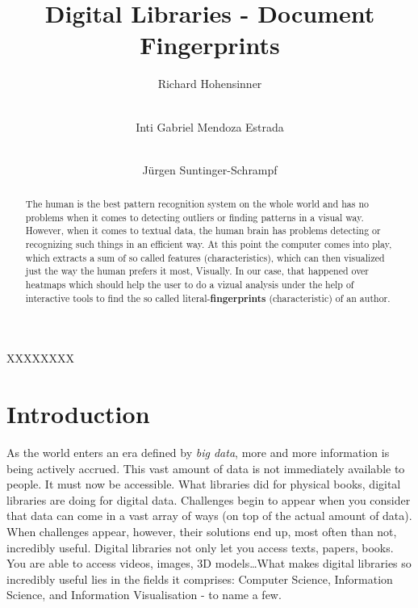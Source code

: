 \documentclass[runningheads]{llncs}
\begin{document}
\title{Digital Libraries - Document Fingerprints}

\author{Richard Hohensinner \and \\
Inti Gabriel Mendoza Estrada \and     \\
Jürgen Suntinger-Schrampf}

\maketitle              %

\begin{abstract}
The human is the best pattern recognition system on the whole world and has no problems when it comes to detecting outliers or finding patterns in a visual way. However, when it comes to textual data, the human brain has problems detecting or recognizing such things in an efficient way. At this point the computer comes into play, which extracts a sum of so called features (characteristics), which can then visualized just the way the human prefers it most, Visually. In our case, that happened over heatmaps which should help the user to do a vizual analysis under the help of interactive tools to find the so called literal-\textbf{fingerprints} (characteristic) of an author.

\end{abstract}


XXXXXXXX
\section{Introduction}
As the world enters an era defined by \textit{big data}, more and more information is being actively accrued. This vast amount of data is not immediately available to people. It must now be accessible. What libraries did for physical books, digital libraries are doing for digital data. Challenges begin to appear when you consider that data can come in a vast array of ways (on top of the actual amount of data). When challenges appear, however, their solutions end up, most often than not, incredibly useful. Digital libraries not only let you access texts, papers, books. You are able to access videos, images, 3D models\ldots What makes digital libraries so incredibly useful lies in the fields it comprises: Computer Science, Information Science, and Information Visualisation - to name a few. 
\end{document}
